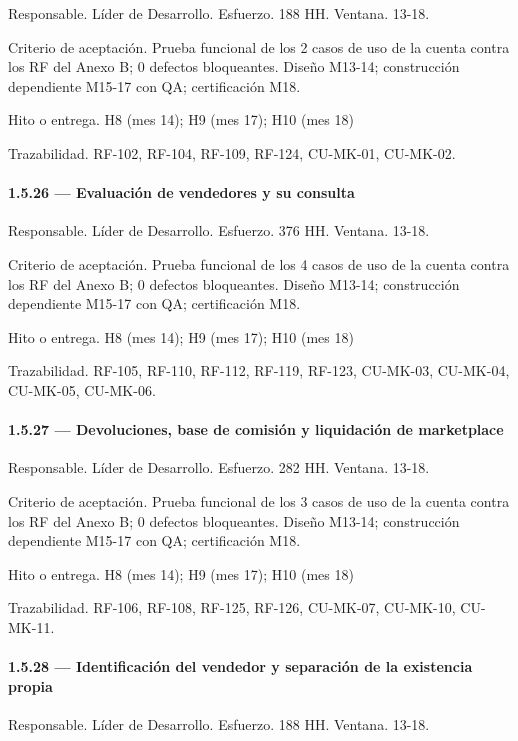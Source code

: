 \documentclass[11pt]{article}
\begin{document}
Responsable. Líder de Desarrollo. Esfuerzo. 188 HH. Ventana. 13-18.

Criterio de aceptación. Prueba funcional de los 2 casos de uso de la cuenta contra los RF del Anexo B; 0 defectos bloqueantes. Diseño M13-14; construcción dependiente M15-17 con QA; certificación M18.

Hito o entrega. H8 (mes 14); H9 (mes 17); H10 (mes 18)

Trazabilidad. RF-102, RF-104, RF-109, RF-124, CU-MK-01, CU-MK-02.

\paragraph{1.5.26 — Evaluación de vendedores y su consulta}

Responsable. Líder de Desarrollo. Esfuerzo. 376 HH. Ventana. 13-18.

Criterio de aceptación. Prueba funcional de los 4 casos de uso de la cuenta contra los RF del Anexo B; 0 defectos bloqueantes. Diseño M13-14; construcción dependiente M15-17 con QA; certificación M18.

Hito o entrega. H8 (mes 14); H9 (mes 17); H10 (mes 18)

Trazabilidad. RF-105, RF-110, RF-112, RF-119, RF-123, CU-MK-03, CU-MK-04, CU-MK-05, CU-MK-06.

\paragraph{1.5.27 — Devoluciones, base de comisión y liquidación de marketplace}

Responsable. Líder de Desarrollo. Esfuerzo. 282 HH. Ventana. 13-18.

Criterio de aceptación. Prueba funcional de los 3 casos de uso de la cuenta contra los RF del Anexo B; 0 defectos bloqueantes. Diseño M13-14; construcción dependiente M15-17 con QA; certificación M18.

Hito o entrega. H8 (mes 14); H9 (mes 17); H10 (mes 18)

Trazabilidad. RF-106, RF-108, RF-125, RF-126, CU-MK-07, CU-MK-10, CU-MK-11.

\paragraph{1.5.28 — Identificación del vendedor y separación de la existencia propia}

Responsable. Líder de Desarrollo. Esfuerzo. 188 HH. Ventana. 13-18.
\end{document}
